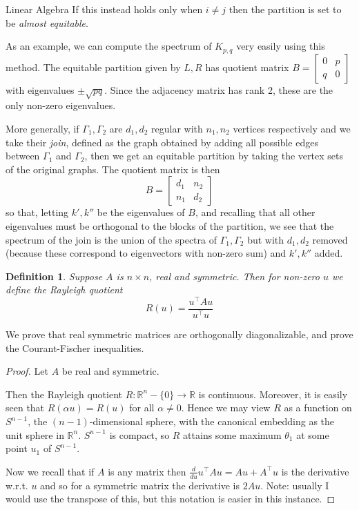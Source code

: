 \documentclass{article}
\newcommand{\R}{\mathbb R}
\newtheorem{defn}{Definition}
\begin{document}
\begin{section}{Linear Algebra}
  If this instead holds only when $i \neq j$ then the partition is set to be \emph{almost equitable}.

  As an example, we can compute the spectrum of $K_{p,q}$ very easily using this method.
  The equitable partition given by $L,R$ has quotient matrix $B = \begin{bmatrix} 0 & p \\ q & 0 \end{bmatrix}$ with eigenvalues $\pm\sqrt{pq}$.
  Since the adjacency matrix has rank 2, these are the only non-zero eigenvalues.

  More generally, if $\Gamma_1, \Gamma_2$ are $d_1,d_2$ regular with $n_1,n_2$ vertices respectively and we take their \emph{join}, defined as the graph obtained by adding all possible edges between $\Gamma_1$ and $\Gamma_2$, then we get an equitable partition by taking the vertex sets of the original graphs.
  The quotient matrix is then 
  $$
  B =
  \begin{bmatrix}
    d_1 & n_2\\
    n_1 & d_2
  \end{bmatrix}
  $$
  so that, letting $k',k''$ be the eigenvalues of $B$, and recalling that all other eigenvalues must be orthogonal to the blocks of the partition, we see that
  the spectrum of the join is the union of the spectra of $\Gamma_1, \Gamma_2$ but with $d_1,d_2$ removed (because these correspond to eigenvectors with non-zero sum) and $k',k''$ added.
  \begin{defn}
    Suppose $A$ is $n \times n$, real and symmetric.
    Then for non-zero $u$ we define the Rayleigh quotient
    $$
    R(u) = \frac{u^\intercal A u}{u^\intercal u}
    $$
  \end{defn}
  We prove that real symmetric matrices are orthogonally diagonalizable, and prove the Courant-Fischer inequalities.
  \begin{proof}
    Let $A$ be real and symmetric.

    Then the Rayleigh quotient $R : \R^n - \{0\} \to \R$ is continuous.
    Moreover, it is easily seen that $R(\alpha u) = R(u)$ for all $\alpha \neq 0$.
    Hence we may view $R$ as a function on $S^{n-1}$, the $(n-1)$-dimensional sphere, with the canonical embedding as the unit sphere in $\R^n$.
    $S^{n-1}$ is compact, so $R$ attains some maximum $\theta_1$ at some point $u_1$ of $S^{n-1}$.

    Now we recall that if $A$ is any matrix then $\frac{d}{du} u^\intercal A u = Au + A^\intercal u$ is the derivative w.r.t. $u$ and so for a symmetric matrix
    the derivative is $2Au$.
    Note: usually I would use the transpose of this, but this notation is easier in this instance.


\end{proof}
\end{section}
\end{document}
